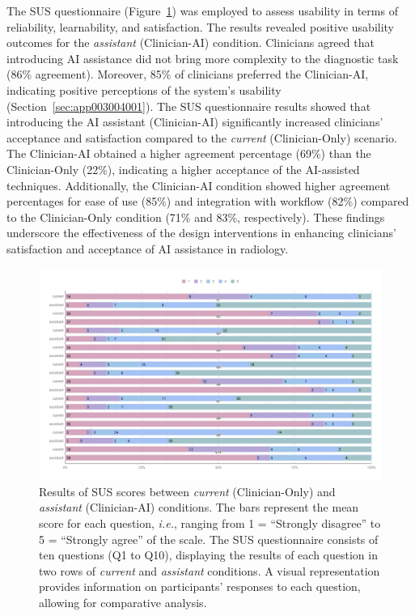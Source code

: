 The \ac{SUS} questionnaire (Figure~\ref{fig:fig109}) was employed to assess usability in terms of reliability, learnability, and satisfaction.
The results revealed positive usability outcomes for the {\it assistant} (Clinician-AI) condition.
Clinicians agreed that introducing \ac{AI} assistance did not bring more complexity to the diagnostic task (86\% agreement).
Moreover, 85\% of clinicians preferred the Clinician-AI, indicating positive perceptions of the system's usability (Section~\ref{sec:app003004001}).
The \ac{SUS} questionnaire results showed that introducing the \ac{AI} assistant (Clinician-AI) significantly increased clinicians' acceptance and satisfaction compared to the {\it current} (Clinician-Only) scenario.
The Clinician-AI obtained a higher agreement percentage (69\%) than the Clinician-Only (22\%), indicating a higher acceptance of the \ac{AI}-assisted techniques.
Additionally, the Clinician-AI condition showed higher agreement percentages for ease of use (85\%) and integration with workflow (82\%) compared to the Clinician-Only condition (71\% and 83\%, respectively).
These findings underscore the effectiveness of the design interventions in enhancing clinicians' satisfaction and acceptance of AI assistance in radiology.

\begin{figure}[ht]
\centering
\includegraphics[width=\columnwidth]{images/fig109}
\caption{Results of SUS scores between {\it current} (Clinician-Only) and {\it assistant} (Clinician-AI) conditions. The bars represent the mean score for each question, {\it i.e.}, ranging from 1 = ``Strongly disagree'' to 5 = ``Strongly agree'' of the scale. The SUS questionnaire consists of ten questions (Q1 to Q10), displaying the results of each question in two rows of {\it current} and {\it assistant} conditions. A visual representation provides information on participants' responses to each question, allowing for comparative analysis.}
\label{fig:fig109}
\end{figure}

